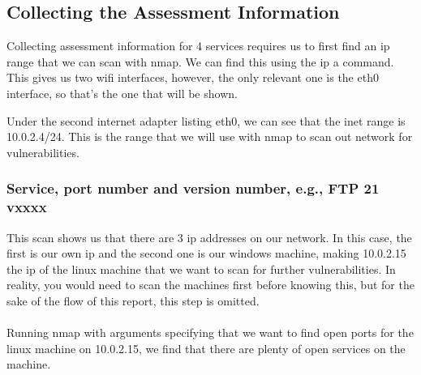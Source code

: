 \subsection{Collecting the Assessment Information}
Collecting assessment information for 4 services requires us to first find an ip range that we can scan with nmap. We can find this using the ip a command. This gives us two wifi interfaces, however, the only relevant one is the eth0 interface, so that's the one that will be shown.


Under the second internet adapter listing eth0, we can see that the inet range is 10.0.2.4/24. This is the range that we will use with nmap to scan out network for vulnerabilities.

\subsubsection{Service, port number and version number, e.g., FTP 21 vxxxx}

This scan shows us that there are 3 ip addresses on our network. In this case, the first is our own ip and the second one is our windows machine, making 10.0.2.15 the ip of the linux machine that we want to scan for further vulnerabilities. In reality, you would need to scan the machines first before knowing this, but for the sake of the flow of this report, this step is omitted.
\\\\
Running nmap with arguments specifying that we want to find open ports for the linux machine on 10.0.2.15, we find that there are plenty of open services on the machine.


